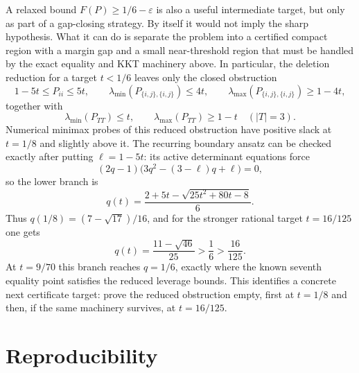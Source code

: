\documentclass[11pt]{article}
\numberwithin{equation}{section}
\theoremstyle{definition}
\begin{document}
A relaxed bound $F(P)\ge 1/6-\varepsilon$ is also a useful intermediate target,
but only as part of a gap-closing strategy.  By itself it would not imply the
sharp hypothesis.  What it can do is separate the problem into a certified
compact region with a margin gap and a small near-threshold region that must be
handled by the exact equality and KKT machinery above.  In particular, the
deletion reduction for a target \(t<1/6\) leaves only the closed obstruction
\[
  1-5t\le P_{ii}\le 5t,\qquad
  \lambda_{\min}(P_{\{i,j\},\{i,j\}})\le4t,\qquad
  \lambda_{\max}(P_{\{i,j\},\{i,j\}})\ge1-4t,
\]
together with
\[
  \lambda_{\min}(P_{TT})\le t,\qquad
  \lambda_{\max}(P_{TT})\ge1-t
  \quad (|T|=3).
\]
Numerical minimax probes of this reduced obstruction have positive slack at
\(t=1/8\) and slightly above it.  The recurring boundary ansatz can be checked
exactly after putting \(\ell=1-5t\): its active determinant equations force
\[
  (2q-1)\bigl(3q^2-(3-\ell)q+\ell\bigr)=0,
\]
so the lower branch is
\[
  q(t)=\frac{2+5t-\sqrt{25t^2+80t-8}}6 .
\]
Thus \(q(1/8)=(7-\sqrt{17})/16\), and for the stronger rational target
\(t=16/125\) one gets
\[
  q(t)=\frac{11-\sqrt{46}}{25}> \frac16 > \frac{16}{125}.
\]
At \(t=9/70\) this branch reaches \(q=1/6\), exactly where the known seventh
equality point satisfies the reduced leverage bounds.  This identifies a
concrete next certificate target: prove the reduced obstruction empty, first at
\(t=1/8\) and then, if the same machinery survives, at \(t=16/125\).

\section{Reproducibility}\label{sec:repro}
\end{document}
